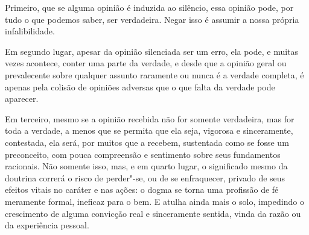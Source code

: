 Primeiro, que se alguma opinião é induzida ao silêncio, essa opinião
pode, por tudo o que podemos saber, ser verdadeira. Negar isso é
assumir a nossa própria infalibilidade. 

Em segundo lugar, apesar da opinião silenciada ser um erro, ela pode, e
muitas vezes acontece, conter uma parte da verdade, e desde que a opinião
geral ou prevalecente sobre qualquer assunto raramente ou nunca é a
verdade completa, é apenas pela colisão de opiniões adversas que o que
falta da verdade pode aparecer. 

 Em terceiro, mesmo se a opinião recebida não for somente verdadeira,
mas for toda a verdade, a menos que se permita que ela seja, vigorosa e
sinceramente, contestada, ela será, por muitos que a recebem,
sustentada como se fosse um preconceito, com pouca compreensão e
sentimento sobre seus fundamentos racionais. Não somente isso, mas, e
em quarto lugar, o significado mesmo da doutrina correrá o risco de
perder"-se, ou de se enfraquecer, privado de seus efeitos vitais no
caráter e nas ações: o dogma se torna uma profissão de fé meramente
formal, ineficaz para o bem. E atulha ainda mais o solo,
impedindo o crescimento de alguma convicção real e sinceramente
sentida, vinda da razão ou da experiência pessoal. 

